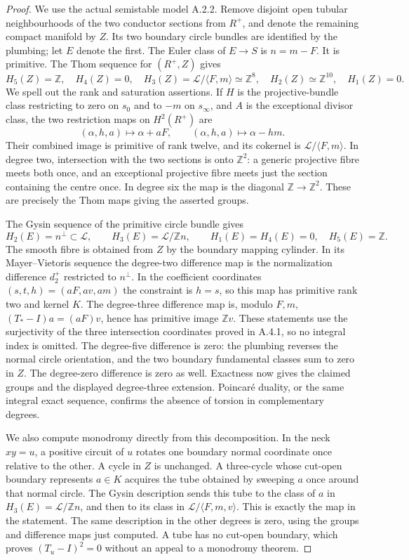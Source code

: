 \begin{proof}
We use the actual semistable model A.2.2. Remove disjoint
open tubular neighbourhoods of the two conductor sections
from $R^+$, and denote the remaining compact manifold by
$Z$. Its two boundary circle bundles are identified by the
plumbing; let $E$ denote the first. The Euler class of
$E\to S$ is $n=m-F$. It is primitive. The Thom sequence
for $(R^+,Z)$ gives
\[
 H_5(Z)=\mathbb Z,\quad H_4(Z)=0,\quad
 H_3(Z)=\mathcal L/\langle F,m\rangle\simeq\mathbb Z^8,
 \quad H_2(Z)\simeq\mathbb Z^{10},\quad H_1(Z)=0.
\]
We spell out the rank and saturation assertions. If $H$ is
the projective-bundle class restricting to zero on $s_0$
and to $-m$ on $s_\infty$, and $A$ is the exceptional
divisor class, the two restriction maps on $H^2(R^+)$ are
\[
 (\alpha,h,a)\longmapsto\alpha+aF,\qquad
 (\alpha,h,a)\longmapsto\alpha-hm.
\]
Their combined image is primitive of rank twelve, and its
cokernel is $\mathcal L/\langle F,m\rangle$. In degree two,
intersection with the two sections is onto $\mathbb Z^2$:
a generic projective fibre meets both once, and an exceptional
projective fibre meets just the section containing the centre
once. In degree six the map is the diagonal
$\mathbb Z\to\mathbb Z^2$. These are precisely the Thom
maps giving the asserted groups.

The Gysin sequence of the primitive circle bundle gives
\[
 H_2(E)=n^\perp\subset\mathcal L,\qquad
 H_3(E)=\mathcal L/\mathbb Z n,\qquad
 H_1(E)=H_4(E)=0,\quad H_5(E)=\mathbb Z.
\]
The smooth fibre is obtained from $Z$ by the boundary
mapping cylinder. In its Mayer--Vietoris sequence the
degree-two difference map is the normalization difference
$d_2^+$ restricted to $n^\perp$. In the coefficient
coordinates $(s,t,h)=(aF,av,am)$ the constraint is $h=s$,
so this map has primitive rank two and kernel $K$.
The degree-three difference map is, modulo $F,m$,
$(T_*-I)a=(aF)v$, hence has primitive image $\mathbb Z v$.
These statements use the surjectivity of the three
intersection coordinates proved in A.4.1, so no integral
index is omitted. The degree-five difference is zero:
the plumbing reverses the normal circle orientation, and
the two boundary fundamental classes sum to zero in $Z$.
The degree-zero difference is zero as well. Exactness now
gives the claimed groups and the displayed degree-three
extension. Poincar\'e duality, or the same integral exact
sequence, confirms the absence of torsion in complementary
degrees.

We also compute monodromy directly from this decomposition.
In the neck $xy=u$, a positive circuit of $u$ rotates one
boundary normal coordinate once relative to the other.
A cycle in $Z$ is unchanged. A three-cycle whose cut-open
boundary represents $a\in K$ acquires the tube obtained
by sweeping $a$ once around that normal circle. The Gysin
description sends this tube to the class of $a$ in
$H_3(E)=\mathcal L/\mathbb Z n$, and then to its class in
$\mathcal L/\langle F,m,v\rangle$. This is exactly the
map in the statement. The same description in the other
degrees is zero, using the groups and difference maps just
computed. A tube has no cut-open boundary, which proves
$(T_u-I)^2=0$ without an appeal to a monodromy theorem.


\end{proof}
